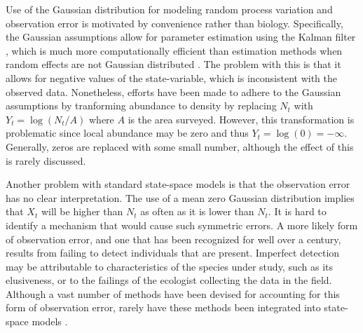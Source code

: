 \documentclass[12pt]{article}
\begin{document}
Use of the Gaussian distribution for modeling random process variation
and observation error is motivated by convenience rather than
biology. Specifically, the Gaussian assumptions
allow for parameter estimation using the Kalman filter
\citep{dennis_etal:2006}, which is much more computationally efficient
than estimation methods when random effects are not Gaussian distributed
\citep{devalpine_hastings:2002}. The problem with this is that it
allows for negative values of the state-variable, which is
inconsistent with the observed data.
Nonetheless, efforts have been made to adhere to the
Gaussian assumptions by tranforming abundance to
density by replacing $N_t$ with $Y_t = \log(N_t/A)$ where $A$ is the
area surveyed. However, this transformation is problematic since
local abundance may be zero and thus $Y_t = \log(0) = -\infty$. Generally,
zeros are replaced with some small number, although the
effect of this is rarely discussed.

Another problem with standard state-space models is that the
observation error has no clear interpretation. The use of a mean zero
Gaussian distribution implies that $X_t$ will be
higher than $N_t$ as often as it is lower than $N_t$. It is hard
to identify a mechanism that would cause such symmetric errors. A more likely
form of observation error, and one that has been recognized for well
over a century, results from failing to detect individuals that are
present. Imperfect detection may be attributable to
characteristics of the species under study, such as its elusiveness,
or to the failings of the ecologist collecting the data in the field.
Although a vast number of methods have been devised for accounting for
this form of observation error, rarely have these methods been
integrated into state-space models \citep[but
see][]{buckland_etal:2004}.
\end{document}
